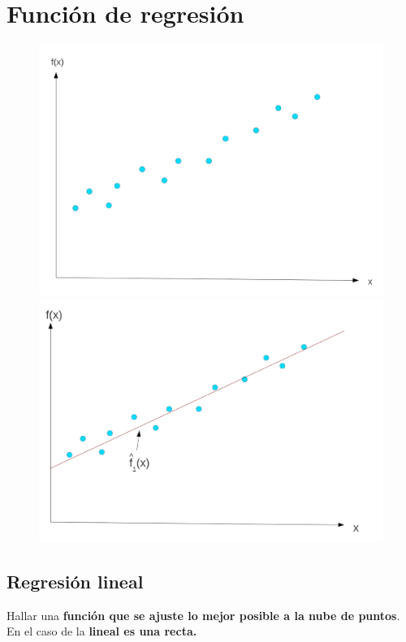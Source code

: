 \documentclass[12pt]{report} %
\begin{document}
\section{Función de regresión}
\begin{figure}[H]
	{\includegraphics[scale=.15]{image-20210305211354068.png}
	\includegraphics[scale=.15]{image-20210305211454026.png}}
\end{figure}

\subsection{Regresión lineal}

Hallar una \textbf{función que se ajuste lo mejor posible a la nube de
puntos}. En el caso de la \textbf{lineal es una recta.}
\end{document}
